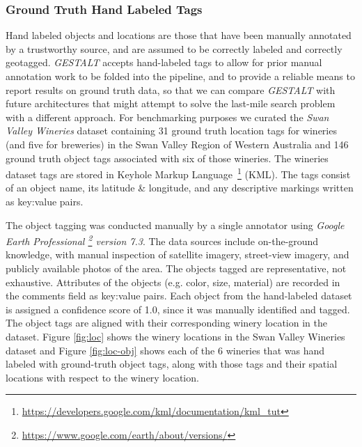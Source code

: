 \subsubsection{Ground Truth Hand Labeled Tags} 
Hand labeled objects and locations are those that have been manually annotated by a trustworthy source, and are assumed to be correctly labeled and correctly geotagged. 
\emph{GESTALT} accepts hand-labeled tags to allow for prior manual annotation work to be folded into the pipeline, and to provide a reliable means to report results on ground truth data, so that we can compare \emph{GESTALT} with future architectures that might attempt to solve the last-mile search problem with a different approach. 
For benchmarking purposes we curated the \emph{Swan Valley Wineries} dataset containing 31 ground truth location tags for wineries (and five for breweries) in the Swan Valley Region of Western Australia and 146 ground truth object tags associated with six of those wineries. 
The wineries dataset tags are stored in Keyhole Markup Language~\footnote{\href{https://developers.google.com/kml/documentation/kml\_tut}{https://developers.google.com/kml/documentation/kml\_tut}} (KML).
The tags consist of an object name, its latitude \& longitude, and any descriptive markings written as key:value pairs. 

The object tagging was conducted manually by a single annotator using \textit{Google Earth Professional \footnote{\href{https://www.google.com/earth/about/versions/}{https://www.google.com/earth/about/versions/}} version 7.3}. 
The data sources include on-the-ground knowledge, with manual inspection of satellite imagery, street-view imagery, and publicly available photos of the area. 
The objects tagged are representative, not exhaustive. 
Attributes of the objects (e.g. color, size, material) are recorded in the comments field as key:value pairs.
Each object from the hand-labeled dataset is assigned a confidence score of 1.0, since it was manually identified and tagged.
The object tags are aligned with their corresponding winery location in the dataset.
Figure \ref{fig:loc} shows the winery locations in the Swan Valley Wineries dataset and Figure \ref{fig:loc-obj} shows each of the 6 wineries that was hand labeled with ground-truth object tags, along with those tags and their spatial locations with respect to the winery location.

